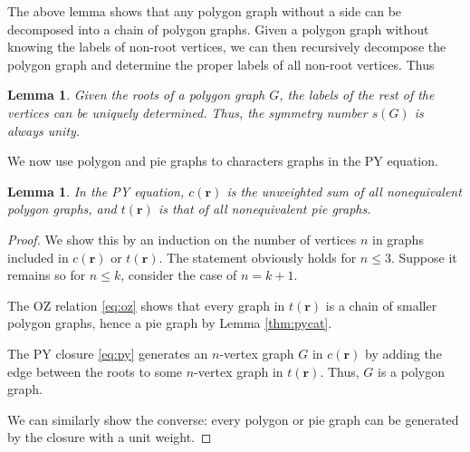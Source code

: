 \documentclass[aip,jcp,reprint,superscriptaddress]{revtex4-1}
\newtheorem{lemm}[thrm]{Lemma}
\newcommand{\vct}[1]{\mathbf{#1}}
\providecommand{\vr}{} %
\renewcommand{\vr}{\vct{r}}
\begin{document}
The above lemma shows that
any polygon graph without a side
can be decomposed into a chain of polygon graphs.
%
Given a polygon graph without knowing the labels of non-root vertices,
we can then recursively decompose the polygon graph
and determine the proper labels of all non-root vertices.
%
Thus

\begin{lemm}
Given the roots of a polygon graph $G$,
  the labels of the rest of the vertices
  can be uniquely determined.
Thus,
  the symmetry number $s(G)$ is always unity.
  \label{thm:polygonsymnum}
\end{lemm}



We now use polygon and pie graphs to characters
  graphs in the PY equation.

\begin{lemm}
In the PY equation,
  $c(\vr)$ is the unweighted sum of
  all nonequivalent polygon graphs,
  and $t(\vr)$ is that of all nonequivalent
  pie graphs\cite{rice1965}.
\label{thm:pycrsum}
\end{lemm}

\begin{proof}
We show this by an induction on the number of vertices $n$ in
  graphs included in $c(\vr)$ or $t(\vr)$.
%
The statement obviously holds for $n \le 3$.
%
Suppose it remains so for $n \le k$,
consider the case of $n = k + 1$.

The OZ relation \eqref{eq:oz}
  shows that every graph in $t(\vr)$
  is a chain of smaller polygon graphs,
  hence a pie graph by Lemma \ref{thm:pycat}.

The PY closure \eqref{eq:py} generates
  an $n$-vertex graph $G$ in $c(\vr)$
  by adding the edge between the roots
  to some $n$-vertex graph in $t(\vr)$.
%
Thus, $G$ is a polygon graph.

We can similarly show the converse:
  every polygon or pie graph
  can be generated by the closure
  with a unit weight.
\end{proof}


\end{document}
